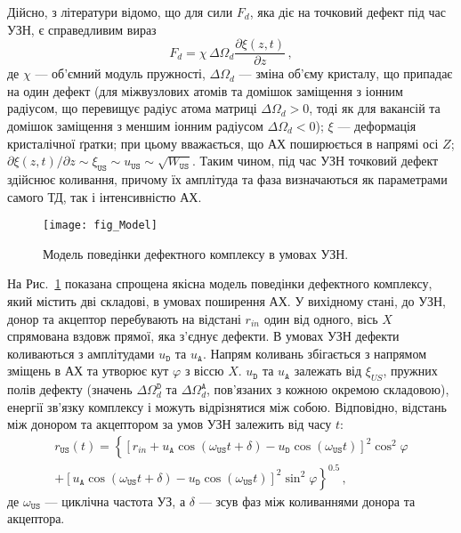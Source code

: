 Дійсно, з літератури \cite{MirzadeJAP2011,PELESHCHAK:UPJ2016} відомо, що для сили $F_d$, яка діє на точковий дефект під час УЗН,
є справедливим вираз
\begin{equation}
\label{eqFd}
F_d=\chi\,\Delta\Omega_d\frac{\partial \xi(z,t)}{\partial z}\,,
\end{equation}
де
$\chi$ --- об'ємний модуль пружності,
$\Delta\Omega_d$ --- зміна об'єму кристалу, що припадає на один дефект
(для міжвузлових атомів та домішок заміщення з іонним радіусом, що перевищує радіус атома матриці $\Delta\Omega_d > 0$,
тоді як для вакансій та домішок заміщення з меншим іонним радіусом $\Delta\Omega_d < 0$);
$\xi$ --- деформація кристалічної ґратки;
при цьому вважається, що АХ поширюється в напрямі осі $Z$;
$\partial \xi(z,t)/\partial z\sim \xi_{\mathtt{US}}\sim u_\mathtt{US} \sim \sqrt{W_\mathtt{US}}$.
Таким чином, під час УЗН точковий дефект здійснює коливання, причому їх амплітуда та фаза визначаються як параметрами самого ТД, так і інтенсивністю АХ.


\begin{figure}
\center
\texttt{[image: fig\_Model]}
\caption{\label{fig_Model}
Модель поведінки дефектного комплексу в умовах УЗН.
}%
\end{figure}

На Рис.~\ref{fig_Model} показана спрощена якісна модель поведінки дефектного комплексу, який містить дві складові,
в умовах поширення АХ.
У вихідному стані, до УЗН, донор та акцептор перебувають на відстані $r_{in}$ один від одного,
вісь $X$ спрямована вздовж прямої, яка з'єднує дефекти.
В умовах УЗН дефекти коливаються з амплітудами $u_\mathtt{D}$ та $u_\mathtt{A}$.
Напрям коливань збігається з напрямом зміщень в АХ та утворює кут $\varphi$ з віссю $X$.
$u_\mathtt{D}$ та $u_\mathtt{A}$ залежать від $\xi_{U\!S}$, пружних полів дефекту (значень $\Delta\Omega_d^\mathtt{D}$ та $\Delta\Omega_d^\mathtt{A}$,
пов'язаних з кожною окремою складовою), енергії зв'язку комплексу і можуть відрізнятися між собою.
Відповідно, відстань між донором та акцептором за умов УЗН залежить від часу $t$:
\begin{multline}
\label{eqrUS}
r_\mathtt{US}(t)=\left\{[r_{in}+u_\mathtt{A}\cos(\omega_\mathtt{US}t+\delta)-u_\mathtt{D}\cos(\omega_\mathtt{US}t)]^2\cos^2\varphi \right.\\
    \left.+ [u_\mathtt{A}\cos(\omega_\mathtt{US}t+\delta)-u_\mathtt{D}\cos(\omega_\mathtt{US}t)]^2\sin^2\varphi\right\}^{0.5}\,,
\end{multline}
де
$\omega_\mathtt{US}$ --- циклічна частота УЗ, а
$\delta$ --- зсув фаз між коливаннями донора та акцептора.


